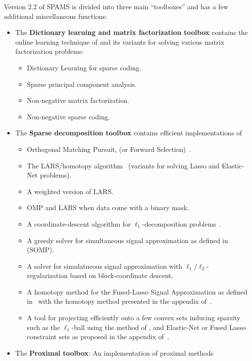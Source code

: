 \documentclass[a4paper, 11pt]{article}
\begin{document}
Version 2.2 of SPAMS is divided into three main ``toolboxes'' and has a few
additional miscellaneous functions:
\begin{itemize}
   \item The \textbf{Dictionary learning and matrix factorization toolbox}
contains the online learning technique of \cite{mairal7,mairal9} and its
variants for solving various matrix factorization problems:
   \begin{itemize}
      \item Dictionary Learning for sparse coding.
      \item Sparse principal component analysis.
      \item Non-negative matrix factorization.
      \item Non-negative sparse coding.
   \end{itemize}
   \item The \textbf{Sparse decomposition toolbox} contains efficient implementations of
      \begin{itemize}
         \item Orthogonal Matching Pursuit, (or Forward Selection)~\cite{weisberg,mallat4}.
         \item The LARS/homotopy algorithm~\cite{efron} (variants for solving Lasso and Elastic-Net problems).
         \item A weighted version of LARS. 
         \item OMP and LARS when data come with a binary mask.
         \item A coordinate-descent algorithm for $\ell_1$-decomposition problems~\cite{fu,friedman,wu}. 
         \item A greedy solver for simultaneous signal approximation as defined in~\cite{tropp2,tropp3} (SOMP).
         \item A solver for simulatneous signal approximation with $\ell_1/\ell_2$-regularization based on block-coordinate descent.
         \item A homotopy method for the Fused-Lasso Signal Approximation as defined in~\cite{friedman} with the homotopy method presented in the appendix of~\cite{mairal9}.
         \item A tool for projecting efficiently onto a few convex sets
inducing sparsity such as the $\ell_1$-ball using the method of
\cite{brucker,maculan,duchi}, and Elastic-Net or Fused Lasso constraint sets as
proposed in the appendix of~\cite{mairal9}.
       \end{itemize}
   \item The \textbf{Proximal toolbox}: An implementation of proximal methods

\end{itemize}
\end{document}
